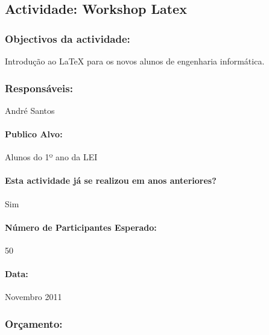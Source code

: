 \subsection{Actividade: Workshop Latex} %

\subsubsection*{Objectivos da actividade:}
Introdução ao LaTeX para os novos alunos de engenharia informática.

\subsubsection*{Responsáveis:}
\begin{itemizedash}
	\item{André Santos}
\end{itemizedash}

\paragraph{Publico Alvo: }
Alunos do 1º ano da LEI

\paragraph{Esta actividade já se realizou em anos anteriores?}
Sim

\paragraph{Número de Participantes Esperado:}
50

\paragraph{Data:} Novembro 2011


\subsubsection*{Orçamento:}

